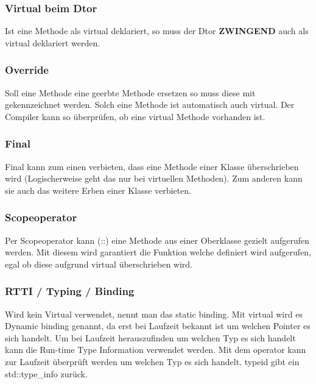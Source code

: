 \subsubsection{Virtual beim Dtor}

Ist eine Methode als virtual deklariert, so muss der Dtor \textbf{ZWINGEND} auch als virtual deklariert werden.

\subsubsection{Override}

Soll eine Methode eine geerbte Methode ersetzen so muss diese mit  gekennzeichnet werden. 
Solch eine Methode ist automatisch auch virtual.
Der Compiler kann so überprüfen, ob eine virtual Methode vorhanden ist.

\subsubsection{Final}

Final kann zum einen verbieten, dass eine Methode einer Klasse überschrieben wird
(Logischerweise geht das nur bei virtuellen Methoden). 
Zum anderen kann sie auch das weitere Erben einer Klasse verbieten. 

\subsubsection{Scopeoperator}

Per Scopeoperator kann (::) eine Methode aus einer Oberklasse gezielt aufgerufen werden. 
Mit diesem wird garantiert die Funktion welche definiert wird aufgerufen, egal ob diese aufgrund virtual überschrieben wird. 



\subsubsection{RTTI / Typing / Binding}

Wird kein Virtual verwendet, nennt man das static binding. 
Mit virtual wird es Dynamic binding genannt, da erst bei Laufzeit bekannt ist um welchen Pointer es sich handelt. 
Um bei Laufzeit herauszufinden um welchen Typ es sich handelt kann die Run-time Type Information verwendet werden. 
Mit dem  operator kann zur Laufzeit überprüft werden um welchen Typ es sich handelt. 
typeid gibt ein std::type\_info zurück. 


